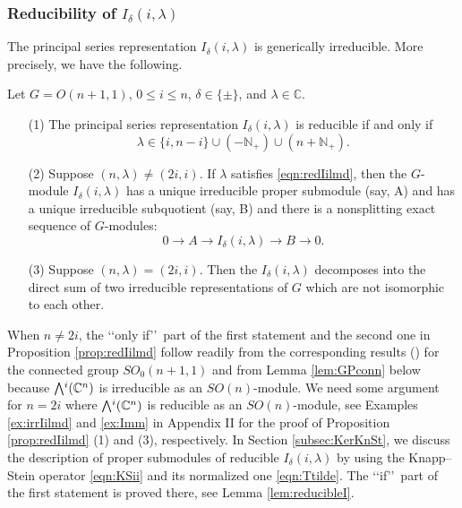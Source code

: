 \subsubsection{Reducibility of $I_{\delta}(i,\lambda)$}
\label{subsec:irredIilmd}
The principal series representation $I_{\delta}(i,\lambda)$
 is generically irreducible.  
More precisely,
 we have the following.
\begin{proposition}
\label{prop:redIilmd}
Let $G=O(n+1,1)$, 
 $0 \le i \le n$, 
 $\delta \in \{\pm\}$, 
 and $\lambda \in {\mathbb{C}}$.  
\begin{enumerate}
\item[{\rm{(1)}}]
The principal series representation $I_{\delta}(i,\lambda)$
 is reducible 
 if and only if 
\begin{equation}
\label{eqn:redIilmd}
 \lambda \in \{i,n-i\} \cup (-{\mathbb{N}}_+) \cup (n+{\mathbb{N}}_+).  
\end{equation}
\item[{\rm{(2)}}]
Suppose $(n,\lambda) \ne (2i,i)$.  
If $\lambda$ satisfies \eqref{eqn:redIilmd}, 
 then the $G$-module $I_{\delta}(i,\lambda)$ 
 has a unique irreducible proper submodule
 (say, A)
 and has a unique irreducible subquotient 
 (say, B)
 and there is a nonsplitting exact sequence
 of $G$-modules:
\[
   0 \to A \to I_{\delta}(i,\lambda) \to B \to 0.  
\]
\item[{\rm{(3)}}]
Suppose $(n,\lambda) = (2i,i)$.  
Then the $I_{\delta}(i,\lambda)$ decomposes
 into the direct sum 
 of two irreducible representations of $G$
 which are not isomorphic to each other.  
\end{enumerate}
\end{proposition}
When $n \ne 2 i$, 
 the \lq\lq{only if}\rq\rq\ part of the first statement and the second one
 in Proposition \ref{prop:redIilmd} follow readily from 
 the corresponding results 
 (\cite{BW,C,Hirai62})
 for the connected group $SO_0(n+1,1)$ 
 and from Lemma \ref{lem:GPconn} below
 because $\Exterior^i({\mathbb{C}}^n)$ is irreducible
 as an $SO(n)$-module.  
We need some argument for $n=2i$
 where $\Exterior^i({\mathbb{C}}^{n})$ is reducible
 as an $SO(n)$-module, 
 see Examples \ref{ex:irrIilmd} and \ref{ex:Imm}
 in Appendix II
 for the proof of Proposition \ref{prop:redIilmd} (1) and (3), 
 respectively.
In Section \ref{subsec:KerKnSt}, 
 we discuss the description of proper submodules
 of reducible $I_{\delta}(i,\lambda)$ by using the Knapp--Stein operator
 \eqref{eqn:KSii}
 and its normalized one \eqref{eqn:Ttilde}.  
The \lq\lq{if}\rq\rq\ part of the first statement is proved there, 
 see Lemma \ref{lem:reducibleI}.  



